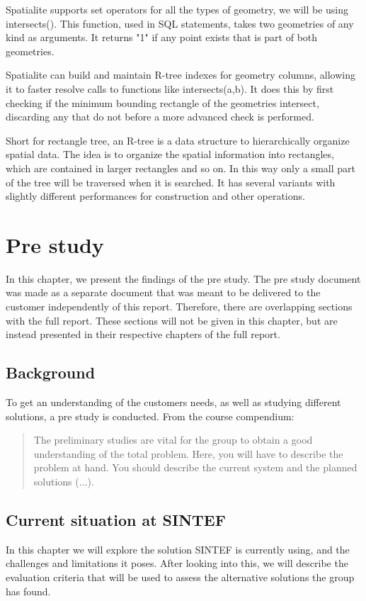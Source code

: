 \documentclass[11pt,a4paper,titlepage,oneside]{report}
\begin{document}
  Spatialite supports set operators for all the types of geometry, we will be using intersects(). This function, used in SQL statements, takes two geometries of any kind as arguments. It returns "1" if any point exists that is part of both geometries.

  Spatialite can build and maintain R-tree indexes for geometry columns, allowing it to faster resolve calls to functions like intersects(a,b). It does this by first checking if the minimum bounding rectangle of the geometries intersect, discarding any that do not before a more advanced check is performed.
  
  Short for rectangle tree, an R-tree is a data structure to hierarchically organize spatial data. The idea is to organize the spatial information into rectangles, which are contained in larger rectangles and so on. In this way only a small part of the tree will be traversed when it is searched.  It has several variants with slightly different performances for construction and other operations.

\chapter{Pre study}
In this chapter, we present the findings of the pre study. The pre study document was made as a separate document that was meant to be delivered to the customer independently of this report. Therefore, there are overlapping sections with the full report. These sections will not be given in this chapter, but are instead presented in their respective chapters of the full report. 

\section{Background}
To get an understanding of the customers needs, as well as studying different solutions, a pre study is conducted. From the \gls{course compendium}:
\begin{quote}
The preliminary studies are vital for the group to obtain a good understanding of the total problem.
Here, you will have to describe the problem at hand. You should describe the current system and the
planned solutions (...).
\cite{TDT4290:Intro}
\end{quote}

\section{Current situation at SINTEF}
In this chapter we will explore the solution SINTEF is currently using, and the challenges and limitations it poses. After looking into this, we will describe the evaluation criteria that will be used to assess the alternative solutions the group has found. 
\end{document}
